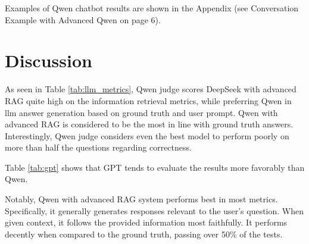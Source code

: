 \documentclass[fleqn,moreauthors,10pt]{ds_report}
\begin{document}
Examples of Qwen chatbot results are shown in the Appendix (see Conversation Example with Advanced Qwen on page 6).


\section*{Discussion}









As seen in Table \ref{tab:llm_metrics}, Qwen judge scores DeepSeek with advanced RAG quite high on the information retrieval metrics, while preferring Qwen in \ac{llm} answer generation based on ground truth and user prompt. Qwen with advanced RAG is considered to be the most in line with ground truth answers. Interestingly, Qwen judge considers even the best model to perform poorly on more than half the questions regarding correctness.

Table \ref{tab:gpt} shows that GPT tends to evaluate the results more favorably than Qwen.

Notably, Qwen with advanced RAG system performs best in most metrics. Specifically, it generally generates responses relevant to the user's question. When given context, it follows the provided information most faithfully. It performs decently when compared to the ground truth, passing over 50\% of the tests.
\end{document}
